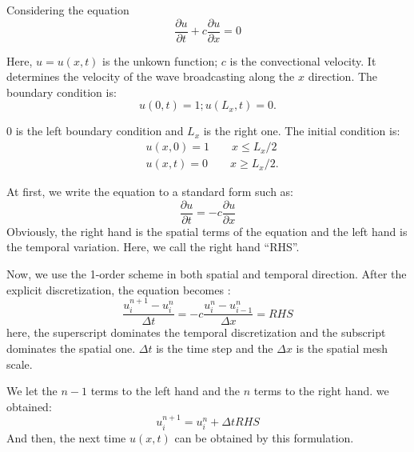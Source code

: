 \documentclass[a4paper]{article}
\begin{document}
\fontsize{12pt}{20pt}\selectfont
Considering the equation
\begin{equation}
  \frac{\partial u}{\partial t}+c\frac{\partial u}{\partial x}=0
\end{equation}

Here, $u=u(x,t)$ is the unkown function; $c$ is the convectional velocity. It determines the velocity of the wave broadcasting along the $x$ direction.
The boundary condition is:
\begin{equation}
  u(0, t)=1; u(L_x, t)=0.
\end{equation}

$0$ is the left boundary condition and $L_x$ is the right one.
The initial condition is:
\begin{equation}
  \begin{split}
  &u(x, 0)=1 \qquad   x\le L_x/2\\
  &u(x, t)=0 \qquad   x\ge L_x/2.
  \end{split}
\end{equation}

At first, we write the equation to a standard form such as:
\begin{equation}
  \frac{\partial u}{\partial t}=-c\frac{\partial u}{\partial x}
\end{equation}
Obviously, the right hand is the spatial terms of the equation and the left hand is the temporal variation. Here, we call the right hand ``RHS''.

Now, we use the 1-order scheme in both spatial and temporal direction.
After the explicit discretization, the equation becomes :
\begin{equation}
\frac{u^{n+1}_i-u^n_i}{\Delta t}=-c\frac{u_i^n-u_{i-1}^n}{\Delta x}=RHS
\end{equation}
here, the superscript dominates the temporal discretization and the subscript dominates the spatial one. $\Delta t$ is the time step and the $\Delta x$ is the spatial mesh scale.

 We let the $n-1$ terms to the left hand and the $n$ terms to the right hand. we obtained:
\begin{equation}
u^{n+1}_i=u^n_i+\Delta t RHS
\end{equation}
And then, the next time $u(x, t)$ can be obtained by this formulation.
\end{document}
